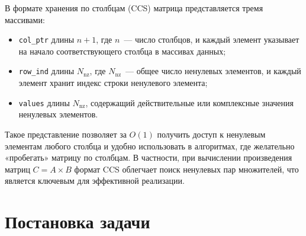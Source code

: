 \documentclass[12pt]{article}
\begin{document}
В формате хранения по столбцам (CCS) матрица представляется тремя массивами:
\begin{itemize}
    \item \texttt{col\_ptr} длины $n+1$, где $n$~— число столбцов, и каждый элемент указывает на начало соответствующего столбца в массивах данных;
    \item \texttt{row\_ind} длины $N_{\text{nz}}$, где $N_{\text{nz}}$~— общее число ненулевых элементов, и каждый элемент хранит индекс строки ненулевого элемента;
    \item \texttt{values} длины $N_{\text{nz}}$, содержащий действительные или комплексные значения ненулевых элементов.
\end{itemize}
Такое представление позволяет за $O(1)$ получить доступ к ненулевым элементам любого столбца и удобно использовать в алгоритмах, где желательно «пробегать» матрицу по столбцам. В частности, при вычислении произведения матриц $C = A \times B$ формат CCS облегчает поиск ненулевых пар множителей, что является ключевым для эффективной реализации.

\section{Постановка задачи}
\end{document}
